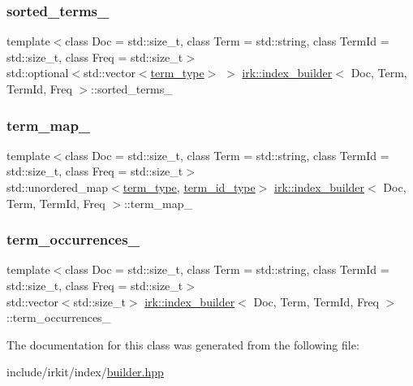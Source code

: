 \subsubsection{\texorpdfstring{sorted\+\_\+terms\+\_\+}{sorted\_terms\_}}
{\footnotesize\ttfamily template$<$class Doc  = std\+::size\+\_\+t, class Term  = std\+::string, class Term\+Id  = std\+::size\+\_\+t, class Freq  = std\+::size\+\_\+t$>$ \\
std\+::optional$<$std\+::vector$<$\mbox{\hyperlink{classirk_1_1index__builder_ad80a8f10f3e72ed3b9a2f181350f3f1f}{term\+\_\+type}}$>$ $>$ \mbox{\hyperlink{classirk_1_1index__builder}{irk\+::index\+\_\+builder}}$<$ Doc, Term, Term\+Id, Freq $>$\+::sorted\+\_\+terms\+\_\+}

\mbox{\label{classirk_1_1index__builder_aa4f91b07c97bcb9830983f72c4eba42b}} 
\subsubsection{\texorpdfstring{term\+\_\+map\+\_\+}{term\_map\_}}
{\footnotesize\ttfamily template$<$class Doc  = std\+::size\+\_\+t, class Term  = std\+::string, class Term\+Id  = std\+::size\+\_\+t, class Freq  = std\+::size\+\_\+t$>$ \\
std\+::unordered\+\_\+map$<$\mbox{\hyperlink{classirk_1_1index__builder_ad80a8f10f3e72ed3b9a2f181350f3f1f}{term\+\_\+type}}, \mbox{\hyperlink{classirk_1_1index__builder_a6736f4a9aa142d3ca15c5e8c3b0a352f}{term\+\_\+id\+\_\+type}}$>$ \mbox{\hyperlink{classirk_1_1index__builder}{irk\+::index\+\_\+builder}}$<$ Doc, Term, Term\+Id, Freq $>$\+::term\+\_\+map\+\_\+}

\mbox{\label{classirk_1_1index__builder_ab2c35e654feb4e162215cc2e684b1241}} 
\subsubsection{\texorpdfstring{term\+\_\+occurrences\+\_\+}{term\_occurrences\_}}
{\footnotesize\ttfamily template$<$class Doc  = std\+::size\+\_\+t, class Term  = std\+::string, class Term\+Id  = std\+::size\+\_\+t, class Freq  = std\+::size\+\_\+t$>$ \\
std\+::vector$<$std\+::size\+\_\+t$>$ \mbox{\hyperlink{classirk_1_1index__builder}{irk\+::index\+\_\+builder}}$<$ Doc, Term, Term\+Id, Freq $>$\+::term\+\_\+occurrences\+\_\+}



The documentation for this class was generated from the following file\+:\begin{DoxyCompactItemize}
\item 
include/irkit/index/\mbox{\hyperlink{builder_8hpp}{builder.\+hpp}}\end{DoxyCompactItemize}
